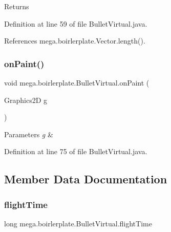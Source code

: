 \begin{DoxyReturn}{Returns}

\end{DoxyReturn}


Definition at line 59 of file Bullet\+Virtual.\+java.



References mega.\+boirlerplate.\+Vector.\+length().

\mbox{\label{classmega_1_1boirlerplate_1_1_bullet_virtual_adb7ec37f1daf7368070539f97cfe307d}} 
\subsubsection{\texorpdfstring{on\+Paint()}{onPaint()}}
{\footnotesize\ttfamily void mega.\+boirlerplate.\+Bullet\+Virtual.\+on\+Paint (\begin{DoxyParamCaption}\item[{Graphics2D}]{g }\end{DoxyParamCaption})}


\begin{DoxyParams}{Parameters}
{\em g} & \\
\hline
\end{DoxyParams}


Definition at line 75 of file Bullet\+Virtual.\+java.



\subsection{Member Data Documentation}
\mbox{\label{classmega_1_1boirlerplate_1_1_bullet_virtual_a2030df7e278f60da85e67a0f0158171f}} 
\subsubsection{\texorpdfstring{flight\+Time}{flightTime}}
{\footnotesize\ttfamily long mega.\+boirlerplate.\+Bullet\+Virtual.\+flight\+Time\hspace{0.3cm}{\ttfamily [private]}}



